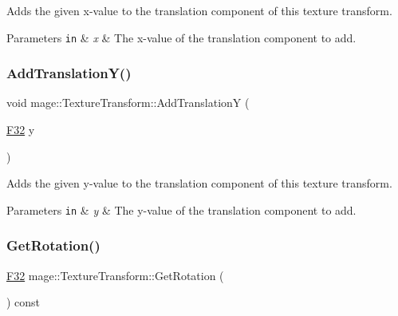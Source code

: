 Adds the given x-\/value to the translation component of this texture transform.


\begin{DoxyParams}[1]{Parameters}
\mbox{\tt in}  & {\em x} & The x-\/value of the translation component to add. \\
\hline
\end{DoxyParams}
\mbox{\label{classmage_1_1_texture_transform_a4c9463ef0b5f3730560093d03b31de15}} 
\subsubsection{\texorpdfstring{Add\+Translation\+Y()}{AddTranslationY()}}
{\footnotesize\ttfamily void mage\+::\+Texture\+Transform\+::\+Add\+TranslationY (\begin{DoxyParamCaption}\item[{\mbox{\hyperlink{namespacemage_aa97e833b45f06d60a0a9c4fc22ae02c0}{F32}}}]{y }\end{DoxyParamCaption})\hspace{0.3cm}{\ttfamily [noexcept]}}

Adds the given y-\/value to the translation component of this texture transform.


\begin{DoxyParams}[1]{Parameters}
\mbox{\tt in}  & {\em y} & The y-\/value of the translation component to add. \\
\hline
\end{DoxyParams}
\mbox{\label{classmage_1_1_texture_transform_ade561a56fa2e80b70c74620277a9afa1}} 
\subsubsection{\texorpdfstring{Get\+Rotation()}{GetRotation()}}
{\footnotesize\ttfamily \mbox{\hyperlink{namespacemage_aa97e833b45f06d60a0a9c4fc22ae02c0}{F32}} mage\+::\+Texture\+Transform\+::\+Get\+Rotation (\begin{DoxyParamCaption}{ }\end{DoxyParamCaption}) const\hspace{0.3cm}{\ttfamily [noexcept]}}


